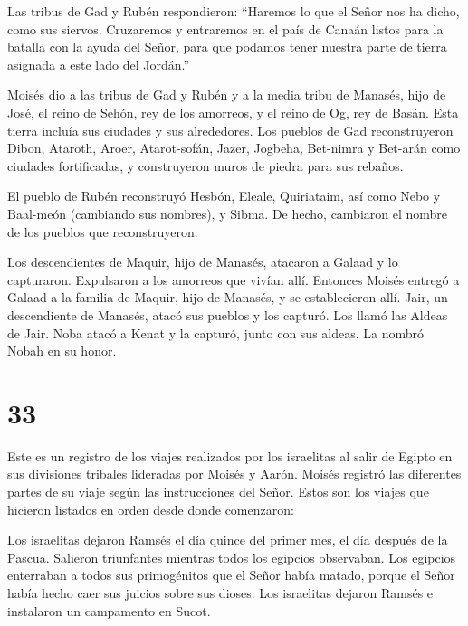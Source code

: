  Las tribus de Gad y Rubén respondieron: ``Haremos lo que
el Señor nos ha dicho, como sus siervos.  Cruzaremos y
entraremos en el país de Canaán listos para la batalla con la ayuda del
Señor, para que podamos tener nuestra parte de tierra asignada a este
lado del Jordán.''

 Moisés dio a las tribus de Gad y Rubén y a la media tribu
de Manasés, hijo de José, el reino de Sehón, rey de los amorreos, y el
reino de Og, rey de Basán. Esta tierra incluía sus ciudades y sus
alrededores.  Los pueblos de Gad reconstruyeron Dibon,
Ataroth, Aroer,  Atarot-sofán, Jazer, Jogbeha,
 Bet-nimra y Bet-arán como ciudades fortificadas, y
construyeron muros de piedra para sus rebaños.

 El pueblo de Rubén reconstruyó Hesbón, Eleale, Quiriataim,
 así como Nebo y Baal-meón (cambiando sus nombres), y
Sibma. De hecho, cambiaron el nombre de los pueblos que reconstruyeron.

 Los descendientes de Maquir, hijo de Manasés, atacaron a
Galaad y lo capturaron. Expulsaron a los amorreos que vivían allí.
 Entonces Moisés entregó a Galaad a la familia de Maquir,
hijo de Manasés, y se establecieron allí.  Jair, un
descendiente de Manasés, atacó sus pueblos y los capturó. Los llamó las
Aldeas de Jair.  Noba atacó a Kenat y la capturó, junto con
sus aldeas. La nombró Nobah en su honor.

\hypertarget{section-32}{%
\section{33}\label{section-32}}

 Este es un registro de los viajes realizados por los
israelitas al salir de Egipto en sus divisiones tribales lideradas por
Moisés y Aarón.  Moisés registró las diferentes partes de su
viaje según las instrucciones del Señor. Estos son los viajes que
hicieron listados en orden desde donde comenzaron:

 Los israelitas dejaron Ramsés el día quince del primer mes,
el día después de la Pascua. Salieron triunfantes mientras todos los
egipcios observaban.  Los egipcios enterraban a todos sus
primogénitos que el Señor había matado, porque el Señor había hecho caer
sus juicios sobre sus dioses.  Los israelitas dejaron Ramsés
e instalaron un campamento en Sucot.

